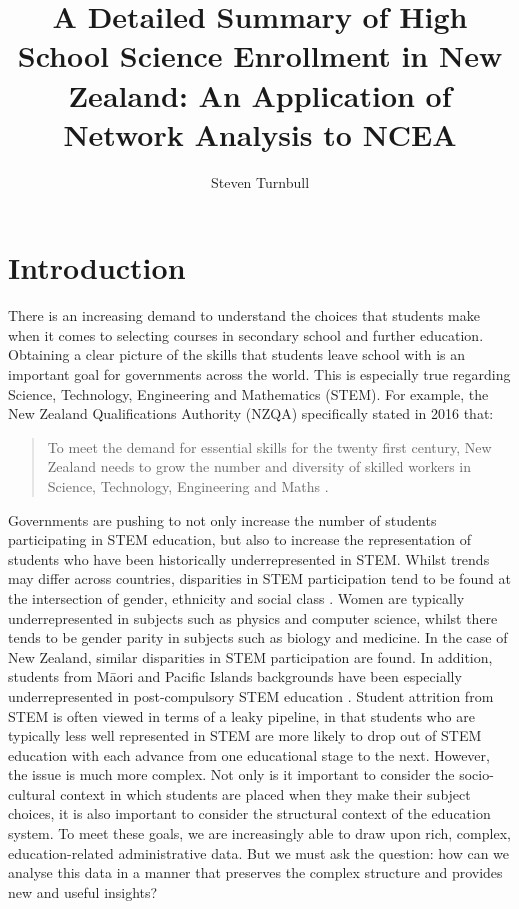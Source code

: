 \documentclass[a4paper]{article}
\title{A Detailed Summary of High School Science Enrollment in New Zealand: An Application of Network Analysis to NCEA}
\author{Steven Turnbull}
\begin{document}
\maketitle



\section{Introduction}
There is an increasing demand to understand the choices that students make when it comes to selecting courses in secondary school and further education. Obtaining a clear picture of the skills that students leave school with is an important goal for governments across the world. This is especially true regarding Science, Technology, Engineering and Mathematics (STEM). For example, the New Zealand Qualifications Authority (NZQA) specifically stated in 2016 that:

\begin{quote}
    To meet the demand for essential skills for the twenty first century, New Zealand needs to grow the number and diversity of skilled workers in Science, Technology, Engineering and Maths \cite[p.8]{NZQA2016}.
\end{quote}  

Governments are pushing to not only increase the number of students participating in STEM education, but also to increase the representation of students who have been historically underrepresented in STEM. Whilst trends may differ across countries, disparities in STEM participation tend to be found at the intersection of gender, ethnicity and social class \cite{Archer2015b, PISA_NZ_2017}. Women are typically underrepresented in subjects such as physics and computer science, whilst there tends to be gender parity in subjects such as biology and medicine. In the case of New Zealand, similar disparities in STEM participation are found. \cite{NZQA2016,EducationCounts_2016a,EducationCounts_2016b} In addition, students from M\={a}ori and Pacific Islands backgrounds have been especially underrepresented in post-compulsory STEM education \cite{MoH2014, NZQA2016}. Student attrition from STEM is often viewed in terms of a leaky pipeline, in that students who are typically less well represented in STEM are more likely to drop out of STEM education with each advance from one educational stage to the next. However, the issue is much more complex. Not only is it important to consider the socio-cultural context in which students are placed when they make their subject choices, it is also important to consider the structural context of the education system. To meet these goals, we are increasingly able to draw upon rich, complex, education-related administrative data. But we must ask the question: how can we analyse this data in a manner that preserves the complex structure and provides new and useful insights?
\end{document}
